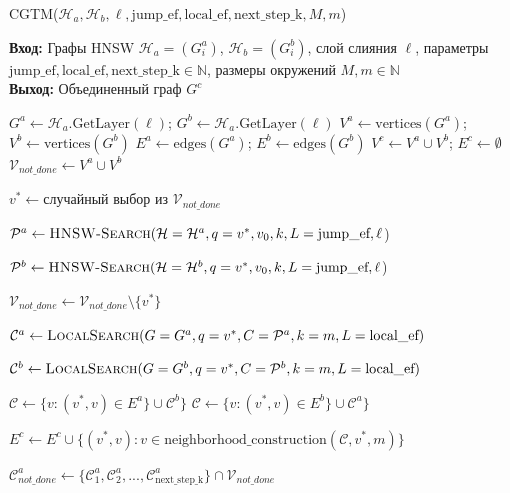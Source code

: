 \documentclass{article}
\begin{document}
\begin{algorithm}
    \caption{\textsc{CGTM}($\mathcal{H}_a, \mathcal{H}_b, \ell, \text{jump\_ef}, \text{local\_ef}, \text{next\_step\_k}, M, m$)}\label{alg:CGTM}
    \textbf{Вход:} Графы HNSW $\mathcal{H}_a = (G^a_i)$, $\mathcal{H}_b = (G^b_i)$, слой слияния $\ell$, параметры $\text{jump\_ef}, \text{local\_ef}, \text{next\_step\_k} \in \mathbb{N}$, размеры окружений $M, m \in \mathbb{N}$ \\
    \textbf{Выход:} Объединенный граф $G^c$ 
\begin{algorithmic}[1]

\State $G^a \gets \mathcal{H}_a\text{.GetLayer}(\ell) $; $G^b \gets\mathcal{H}_a\text{.GetLayer}(\ell)$ 
\State $V^a \gets \text{vertices}(G^a)$; $V^b \gets \text{vertices}(G^b)$
\State $E^a \gets \text{edges}(G^a)$; $E^b \gets \text{edges}(G^b)$
\State $V^c \gets V^a \cup V^b$; $E^c \gets \emptyset$
\State $\mathcal{V}_{not\_done} \gets V^a \cup V^b$

    \State $v^* \gets \text{случайный выбор из } \mathcal{V}_{not\_done}$

    \State $\mathcal{P}^a  \gets \textsc{HNSW-Search}(\mathcal{H}=\mathcal{H}^a, q=v^*, v_0, k, L=\text{jump\_ef}, \ell $)

    \State $\mathcal{P}^b \gets \textsc{HNSW-Search}(\mathcal{H}=\mathcal{H}^b, q=v^*, v_0, k, L=\text{jump\_ef}, \ell $)
    
    
        \State $\mathcal{V}_{not\_done} \gets \mathcal{V}_{not\_done} \setminus \{v^*\}$
        

        \State $ \mathcal{C}^a  \gets \textsc{LocalSearch}(G=G^a, q=v^*, C=\mathcal{P}^a  , k=m, L=\text{local\_ef})$
        
        \State $\mathcal{C}^b \gets \textsc{LocalSearch}(G=G^b, q=v^*, C=\mathcal{P}^b , k=m, L=\text{local\_ef})$
        
            \State $\mathcal{C}\gets  \{v : (v^*, v) \in E^a \} \cup  \mathcal{C}^b\}$
        \Else
            \State $\mathcal{C} \gets  \{v : (v^*, v) \in E^b \} \cup  \mathcal{C}^a\}$
        \EndIf
        
        \State $E^c \gets E^c \cup \{ (v^*, v) : v \in \text{neighborhood\_construction}(\mathcal{C}, v^*, m) \}$
        
        \State $\mathcal{C}^a_{not\_done} \gets \{\mathcal{C}^a_1, \mathcal{C}^a_2, ..., \mathcal{C}^a_{ \text{next\_step\_k} } \} \cap \mathcal{V}_{not\_done}$


\end{algorithmic}
\end{algorithm}
\end{document}

